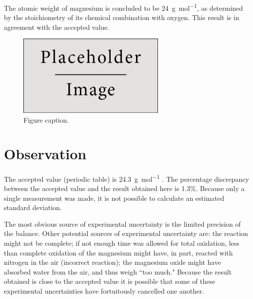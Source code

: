 \documentclass{article}
\begin{document}
The atomic weight of magnesium is concluded to be \SI{24}{\gram\per\mol}, as determined by the stoichiometry of its chemical combination with oxygen. This result is in agreement with the accepted value.

\begin{figure}[h]
\begin{center}
\includegraphics[width=0.65\textwidth]{placeholder} %
\caption{Figure caption.}
\end{center}
\end{figure}


\section{Observation}

The accepted value (periodic table) is \SI{24.3}{\gram\per\mole} \cite{Smith:2012qr}. The percentage discrepancy between the accepted value and the result obtained here is 1.3\%. Because only a single measurement was made, it is not possible to calculate an estimated standard deviation.

The most obvious source of experimental uncertainty is the limited precision of the balance. Other potential sources of experimental uncertainty are: the reaction might not be complete; if not enough time was allowed for total oxidation, less than complete oxidation of the magnesium might have, in part, reacted with nitrogen in the air (incorrect reaction); the magnesium oxide might have absorbed water from the air, and thus weigh ``too much." Because the result obtained is close to the accepted value it is possible that some of these experimental uncertainties have fortuitously cancelled one another.

\end{document}
